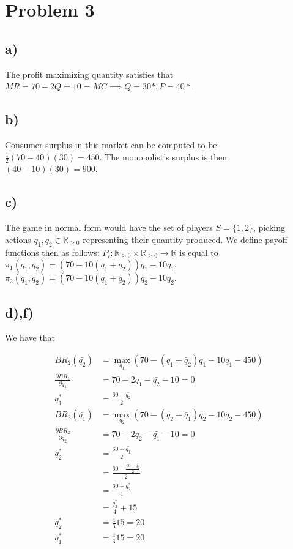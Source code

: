 \documentclass[12pt,letterpaper]{article}
\newcommand\R{\mathbb{R}}
\theoremstyle{definition}
\begin{document}
\section*{Problem 3}


\subsection*{a)}

The profit maximizing quantity satisfies that $MR = 70 - 2Q = 10 = MC \implies Q
= 30*, P = 40*$.

\subsection*{b)}

Consumer surplus in this market can be computed to be $\frac{1}{2}(70-40)(30) =
450$. The monopolist's surplus is then $(40-10)(30) = 900$. 

\subsection*{c)}

The game in normal form would have the set of players $S = \{1, 2\}$, picking
actions $q_1, q_2 \in \R_{\geq 0}$ representing their quantity produced. We
define payoff functions then as follows: $P_i: \R_{\geq 0} \times \R_{\geq 0} \rightarrow \R$ is
equal to $\pi_1(q_1,q_2) = (70 - 10(q_1+q_2))q_1 - 10q_1$, $\pi_2(q_1,q_2) = (70 - 10(q_1+q_2))q_2 - 10q_2$.

\subsection*{d),f)}

We have that

\begin{align*}
  BR_2(\bar{q_2}) &= \max_{q_1}(70 - (q_1+\bar{q}_2)q_1 - 10q_1 - 450) \\
  \frac{\partial BR_1}{\partial q_1} &= 70 - 2q_1 - \bar{q_2} - 10 = 0 \\
  q^*_1 &= \frac{60-\bar{q_2}}{2} \\
  BR_2(\bar{q_1}) &= \max_{q_2}(70 - (q_2+\bar{q}_1)q_2 - 10q_2 - 450) \\
  \frac{\partial BR_2}{\partial q_2} &= 70 - 2q_2 - \bar{q_1} - 10 = 0\\
  q^*_2 &= \frac{60-\bar{q_1}}{2}\\
                                     &= \frac{60 - \frac{60-\bar{q_2}}{2}}{2} \\
                                     &= \frac{60+q^*_2}{4} \\
                                     &= \frac{q^*_2}{4} + 15 \\
  q^*_2 &= \frac{4}{3}15 = 20 \\
  q^*_1 &= \frac{4}{3}15 = 20
\end{align*}
\end{document}
